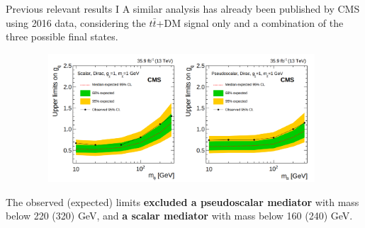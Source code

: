 \documentclass[8pt]{beamer}
\begin{document}
\begin{frame}{Previous relevant results I}
\justifying
\vspace{5pt}
A similar analysis has already been published by CMS using 2016 data, considering the $t \bar t$+DM signal only and a combination of the three possible final states. \vfill %

\vspace{-10pt}
\begin{figure}[htbp]
\begin{center}
\includegraphics[width=11cm, height=4.8cm]{figs/CMSttbarExclusion.png}
\end{center}
\end{figure} \vfill

The observed (expected) limits \textbf{excluded a pseudoscalar mediator} with mass below 220 (320) GeV, and \textbf{a scalar mediator} with mass below 160 (240) GeV. \vfill
\end{frame}
\end{document}
